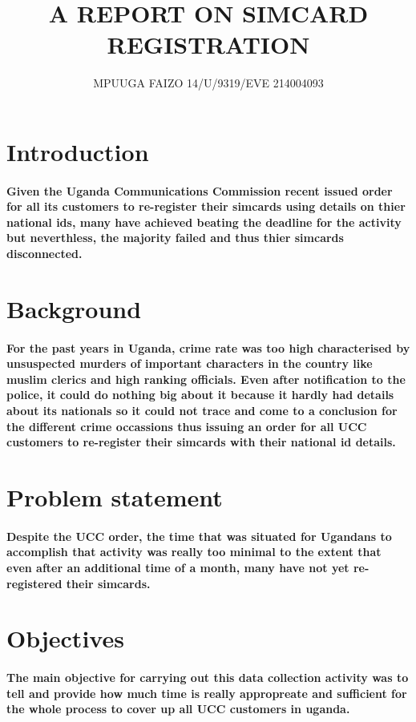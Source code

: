 \documentclass[12pt]{report}
\title{\textbf{A REPORT ON SIMCARD REGISTRATION}}
\author{MPUUGA FAIZO 14/U/9319/EVE 214004093}
\begin{document}
\maketitle


\section{Introduction} 
\paragraph{Given the Uganda Communications Commission recent issued order for all its customers to re-register their simcards using details on thier national ids, many have achieved beating the deadline for the activity but neverthless, the majority failed and thus thier simcards disconnected. }


\section{Background}
\paragraph{For the past years in Uganda, crime rate was too high characterised by unsuspected murders of important characters in the country like muslim clerics and high ranking officials. Even after notification to the police, it could do nothing big about it because it hardly had details about its nationals so it could not trace and come to a conclusion for the different crime occassions thus issuing an order for all UCC customers to re-register their simcards with their national id details.}


\section{Problem statement}
\paragraph{Despite the UCC order, the time that was situated for Ugandans to accomplish that activity was really too minimal to the extent that even after an additional time of a month, many have not yet re-registered their simcards.}

\section{Objectives}
\paragraph{The main objective for carrying out this data collection activity was to tell and provide how much time is really appropreate and sufficient for the whole process to cover up all UCC customers in uganda.}
\end{document}
